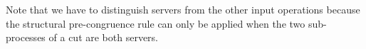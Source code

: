 Note that we have to distinguish servers from the other input operations because
the structural pre-congruence rule \SServer can only be applied when the two
sub-processes of a cut are both servers.

\begin{code}[hide]%
\>[0]\AgdaSpace{}%
\AgdaSymbol{:}\AgdaSpace{}%
\AgdaSpace{}%
\AgdaSpace{}%
\AgdaSpace{}%
\AgdaSpace{}%
\AgdaSymbol{\}}\AgdaSpace{}%
\AgdaSpace{}%
\AgdaSpace{}%
\AgdaSymbol{(}\AgdaSpace{}%
\AgdaSymbol{\{}\AgdaSpace{}%
\AgdaSpace{}%
\AgdaSymbol{\}}\AgdaSpace{}%
\AgdaSpace{}%
\AgdaSpace{}%
\AgdaSpace{}%
\AgdaSymbol{\{}\AgdaSpace{}%
\AgdaSpace{}%
\AgdaSpace{}%
\AgdaSymbol{\}}\AgdaSpace{}%
\AgdaSymbol{)}\<%
\\
\>[0]\AgdaSpace{}%
\AgdaSymbol{(}\AgdaSpace{}%
\AgdaOperator{\AgdaInductiveConstructor{,}}\AgdaSpace{}%
\AgdaSymbol{())}\<%
\\
%
\\[\AgdaEmptyExtraSkip]%
\>[0]\AgdaSpace{}%
\AgdaSymbol{:}\AgdaSpace{}%
\AgdaSpace{}%
\AgdaSpace{}%
\AgdaSpace{}%
\AgdaSpace{}%
\AgdaSymbol{\}}\AgdaSpace{}%
\AgdaSpace{}%
\AgdaSpace{}%
\AgdaSymbol{(}\AgdaSpace{}%
\AgdaSymbol{\{}\AgdaSpace{}%
\AgdaSpace{}%
\AgdaSymbol{\}}\AgdaSpace{}%
\AgdaSpace{}%
\AgdaSpace{}%
\AgdaSpace{}%
\AgdaSymbol{\{}\AgdaSpace{}%
\AgdaSpace{}%
\AgdaSpace{}%
\AgdaSymbol{\}}\AgdaSpace{}%
\AgdaSymbol{)}\<%
\\
\>[0]\AgdaSpace{}%
\AgdaSymbol{(}\AgdaSpace{}%
\AgdaOperator{\AgdaInductiveConstructor{,}}\AgdaSpace{}%
\AgdaSymbol{())}\<%
\\
%
\\[\AgdaEmptyExtraSkip]%

\end{code}
